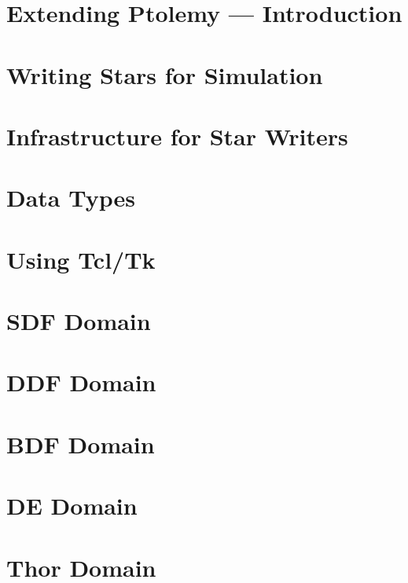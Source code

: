 
\chapter{Extending Ptolemy --- Introduction}
\label{Extending Ptolemy --- Introduction}

\chapter{Writing Stars for Simulation}
\label{Writing Stars for Simulation}

\chapter{Infrastructure for Star Writers}
\label{Infrastructure for Star Writers}

\chapter{Data Types}
\label{Data Types}

\chapter{Using Tcl/Tk}
\label{Using Tcl/Tk}

\chapter{SDF Domain}
\label{SDF Domain}

\chapter{DDF Domain}
\label{DDF Domain}

\chapter{BDF Domain}
\label{BDF Domain}

\chapter{DE Domain}
\label{DE Domain}

\chapter{Thor Domain}
\label{Thor Domain}

